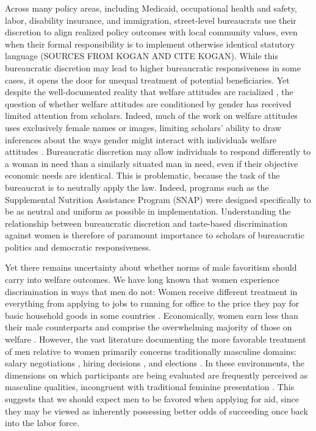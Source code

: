 \documentclass[12pt]{article}%
\begin{document}
\begin{doublespace}
	
Across many policy areas, including Medicaid, occupational health and safety, labor, disability insurance, and immigration, street-level bureaucrats use their discretion to align realized policy outcomes with local community values, even when their formal responsibility is to implement otherwise identical statutory language (SOURCES FROM KOGAN AND CITE KOGAN). While this bureaucratic discretion may lead to higher bureaucratic responsiveness in some cases, it opens the door for unequal treatment of potential beneficiaries. Yet despite the well-documented reality that welfare attitudes are racialized \citep{desante_working_2013, winter_beyond_2006, gilliam_welfare_1999}, the question of whether welfare attitudes are conditioned by gender has received limited attention from scholars. Indeed, much of the work on welfare attitudes uses exclusively female names or images, limiting scholars' ability to draw inferences about the ways gender might interact with individuals welfare attitudes \citep{desante_working_2013, winter_beyond_2006, gilliam_welfare_1999, goren_pliable_2022}. Bureaucratic discretion may allow individuals to respond differently to a woman in need than a similarly situated man in need, even if their objective economic needs are identical. This is problematic, because the task of the bureaucrat is to neutrally apply the law. Indeed, programs such as the Supplemental Nutrition Assistance Program (SNAP) were designed specifically to be as neutral and uniform as possible in implementation. Understanding the relationship between bureaucratic discretion and taste-based discrimination against women is therefore of paramount importance to scholars of bureaucratic politics and democratic responsiveness.

Yet there remains uncertainty about whether norms of male favoritism should carry into welfare outcomes. We have long known that women experience discrimination in ways that men do not: Women receive different treatment in everything from applying to jobs \citep{quadlin_market} to running for office \citep{hassell_partys_2019} to the price they pay for basic household goods in some countries \citep{betz_womens_2021}. Economically, women earn less than their male counterparts \citep{mandel_up_2013} and comprise the overwhelming majority of those on welfare \citep{abramovitz_regulating_2017, fraser_women_1989}. However, the vast literature documenting the more favorable treatment of men relative to women primarily concerns traditionally masculine domains: salary negotiations \citep{castillo_gender_2013}, hiring decisions \citep{neumark_sex_1996, goldin_orchestrating_2000}, and elections \citep{clayton_how_2020}. In these environments, the dimensions on which participants are being evaluated are frequently perceived as masculine qualities, incongruent with traditional feminine presentation \citep{eagly_role_2002, koenig_are_2011}. This suggests that we should expect men to be favored when applying for aid, since they may be viewed as inherently possessing better odds of succeeding once back into the labor force.


\end{doublespace}
\end{document}
